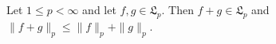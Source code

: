 Let $1 \leq p < \infty$ and let $f, g \in \mathfrak{L}_p$. Then $f + g \in \mathfrak{L}_p$ and $\|f + g\|_p \leq \|f\|_p + \|g\|_p$.
